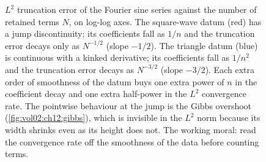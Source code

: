 \begin{figure}[htbp]
\centering
{}
\caption[Fourier convergence rate set by smoothness]{$L^2$
truncation error of the Fourier sine series against the number of
retained terms $N$, on log-log axes. The square-wave datum (red) has
a jump discontinuity; its coefficients fall as $1/n$ and the
truncation error decays only as $N^{-1/2}$ (slope $-1/2$). The
triangle datum (blue) is continuous with a kinked derivative; its
coefficients fall as $1/n^2$ and the truncation error decays as
$N^{-3/2}$ (slope $-3/2$). Each extra order of smoothness of the
datum buys one extra power of $n$ in the coefficient decay and one
extra half-power in the $L^2$ convergence rate. The pointwise
behaviour at the jump is the Gibbs overshoot
(\cref{fig:vol02:ch12:gibbs}), which is invisible in the $L^2$ norm
because its width shrinks even as its height does not. The working
moral: read the convergence rate off the smoothness of the data
before counting terms.}
\label{fig:vol02:ch12:fourier-convergence}
\end{figure}
